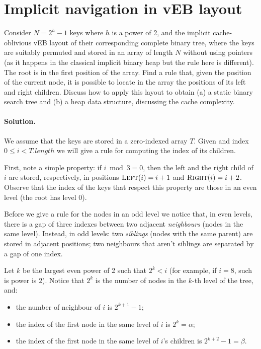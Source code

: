 \section{Implicit navigation in vEB layout}
Consider $N = 2^h - 1$ keys where $h$ is a power of 2, and the implicit cache-oblivious vEB layout of their corresponding complete binary tree, where the keys are suitably permuted and stored in an array of length $N$ without using pointers (as it happens in the classical implicit binary heap but the rule here is different). The root is in the first position of the array. Find a rule that, given the position of the current node, it is possible to locate in the array the positions of its left and right children. Discuss how to apply this layout to obtain (a) a static binary search tree and (b) a heap data structure, discussing the cache complexity.

\vspace{0.5cm}
\paragraph{Solution.} We assume that the keys are stored in a zero-indexed array $T$. Given and index $0 \leq i < T.length$ we will give a rule for computing the index of its children.

\begin{center}
\end{center}

First, note a simple property: if $i \bmod 3 = 0$, then the left and the right child of $i$ are stored, respectively, in positions $\textsc{Left}(i)=i+1$ and $\textsc{Right}(i)=i+2$. Observe that the index of the keys that respect this property are those in an even level (the root has level 0).

Before we give a rule for the nodes in an odd level we notice that, in even levels, there is a gap of three indexes between two adjacent \emph{neighbours} (nodes in the same level). Instead, in odd levels: two \emph{siblings} (nodes with the same parent) are stored in adjacent positions; two neighbours that aren't siblings are separated by a gap of one index.

Let $k$ be the largest even power of 2 such that $2^k<i$ (for example, if $i=8$, such is power is $2$). Notice that $2^k$ is the number of nodes in the $k$-th level of the tree, and:
\begin{itemize}
  \item the number of neighbour of $i$ is $2^{k+1}-1$;
  \item the index of the first node in the same level of $i$ is $2^k=\alpha$;
 \item the index of the first node in the same level of $i$'s children is $2^{k+2}-1=\beta$.
\end{itemize}

